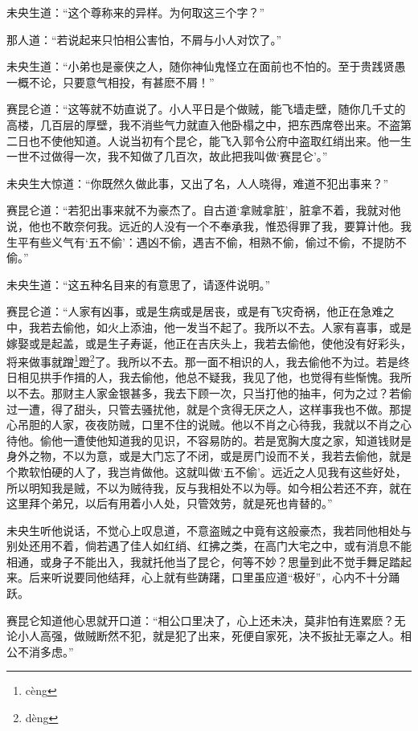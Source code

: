 \documentclass[a4paper,12pt,UTF8,twoside]{ctexbook}
\begin{document}
未央生道：“这个尊称来的异样。为何取这三个字？”

那人道：“若说起来只怕相公害怕，不屑与小人对饮了。”

未央生道：“小弟也是豪侠之人，随你神仙鬼怪立在面前也不怕的。至于贵践贤愚一概不论，只要意气相投，有甚麽不屑！”

赛昆仑道：“这等就不妨直说了。小人平日是个做贼，能飞墙走壁，随你几千丈的高楼，几百层的厚壁，我不消些气力就直入他卧榻之中，把东西席卷出来。不盗第二日也不使他知道。人说当初有个昆仑，能飞入郭令公府中盗取红绡出来。他一生一世不过做得一次，我不知做了几百次，故此把我叫做‘赛昆仑’。”

未央生大惊道：“你既然久做此事，又出了名，人人晓得，难道不犯出事来？”

赛昆仑道：“若犯出事来就不为豪杰了。自古道‘拿贼拿脏’，脏拿不着，我就对他说，他也不敢奈何我。远近的人没有一个不奉承我，惟恐得罪了我，要算计他。我生平有些义气有‘五不偷’：遇凶不偷，遇吉不偷，相熟不偷，偷过不偷，不提防不偷。”

未央生道：“这五种名目来的有意思了，请逐件说明。”

赛昆仑道：“人家有凶事，或是生病或是居丧，或是有飞灾奇祸，他正在急难之中，我若去偷他，如火上添油，他一发当不起了。我所以不去。人家有喜事，或是嫁娶或是起盖，或是生子寿诞，他正在吉庆头上，我若去偷他，使他没有好彩头，将来做事就蹭\footnote{c\`eng}蹬\footnote{d\`eng}了。我所以不去。那一面不相识的人，我去偷他不为过。若是终日相见拱手作揖的人，我去偷他，他总不疑我，我见了他，也觉得有些惭愧。我所以不去。那财主人家金银甚多，我去下顾一次，只当打他的抽丰，何为之过？若偷过一遭，得了甜头，只管去骚扰他，就是个贪得无厌之人，这样事我也不做。那提心吊胆的人家，夜夜防贼，口里不住的说贼。他以不肖之心待我，我就以不肖之心待他。偷他一遭使他知道我的见识，不容易防的。若是宽胸大度之家，知道钱财是身外之物，不以为意，或是大门忘了不闭，或是房门设而不关，我若去偷他，就是个欺软怕硬的人了，我岂肯做他。这就叫做‘五不偷’。远近之人见我有这些好处，所以明知我是贼，不以为贼待我，反与我相处不以为辱。如今相公若还不弃，就在这里拜个弟兄，以后有用着小人处，只管效劳，就是死也肯替的。”

未央生听他说话，不觉心上叹息道，不意盗贼之中竟有这般豪杰，我若同他相处与别处还用不着，倘若遇了佳人如红绡、红拂之类，在高门大宅之中，或有消息不能相通，或身子不能出入，我就托他当了昆仑，何等不妙？思量到此不觉手舞足踏起来。后来听说要同他结拜，心上就有些踌躇，口里虽应道“极好”，心内不十分踊跃。

赛昆仑知道他心思就开口道：“相公口里决了，心上还未决，莫非怕有连累麽？无论小人高强，做贼断然不犯，就是犯了出来，死便自家死，决不扳扯无辜之人。相公不消多虑。”
\end{document}

